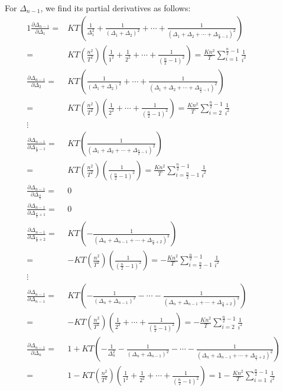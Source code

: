 For $\Delta_{n-1}$, we find its partial derivatives as follows:
\begin{alignat}{1}
{\frac{\partial \Delta_{n-1}}{\partial \Delta_{1}}} =& KT\left(\frac{1}{\Delta_1^2} + \frac{1}{(\Delta_1 + \Delta_2)^2} + \cdots + \frac{1}{(\Delta_1 + \Delta_2 + \cdots + \Delta_{\frac{n}{2}-1})^2}\right) \nonumber \\
=&KT\left(\frac{n^2}{T^2}\right)\left(\frac{1}{1^2} + \frac{1}{2^2} + \cdots + \frac{1}{(\frac{n}{2}-1)^2}\right) = \frac{Kn^2}{T} \sum\limits_{i=1}^{\frac{n}{2}-1}{\frac{1}{i^2}} \nonumber \\
{\frac{\partial \Delta_{n-1}}{\partial \Delta_{2}}} =& KT\left(\frac{1}{(\Delta_1 + \Delta_2)^2} + \cdots + \frac{1}{(\Delta_1 + \Delta_2 + \cdots + \Delta_{\frac{n}{2}-1})^2}\right) \nonumber \\
=&KT\left(\frac{n^2}{T^2}\right)\left(\frac{1}{2^2} + \cdots + \frac{1}{(\frac{n}{2}-1)^2}\right) = \frac{Kn^2}{T} \sum\limits_{i=2}^{\frac{n}{2}-1}{\frac{1}{i^2}} \nonumber \\
\vdots \nonumber \\
{\frac{\partial \Delta_{n-1}}{\partial \Delta_{\frac{n}{2}-1}}} =& KT\left(\frac{1}{(\Delta_1 + \Delta_2 + \cdots + \Delta_{\frac{n}{2}-1})^2}\right) \nonumber \\
=&KT\left(\frac{n^2}{T^2}\right)\left(\frac{1}{(\frac{n}{2}-1)^2}\right) = \frac{Kn^2}{T} \sum\limits_{i=\frac{n}{2}-1}^{\frac{n}{2}-1}{\frac{1}{i^2}} \nonumber \\	
{\frac{\partial \Delta_{n-1}}{\partial \Delta_{\frac{n}{2}}}} =& 0 \nonumber \\
{\frac{\partial \Delta_{n-1}}{\partial \Delta_{\frac{n}{2}+1}}} =& 0 \nonumber \\
{\frac{\partial \Delta_{n-1}}{\partial \Delta_{\frac{n}{2}+2}}} =& KT\left(-\frac{1}{(\Delta_n + \Delta_{n-1} + \cdots + \Delta_{\frac{n}{2}+2})^2}\right) \nonumber \\
=&-KT\left(\frac{n^2}{T^2}\right)\left(\frac{1}{(\frac{n}{2}-1)^2}\right) = -\frac{Kn^2}{T} \sum\limits_{i=\frac{n}{2}-1}^{\frac{n}{2}-1}{\frac{1}{i^2}} \nonumber \\	
\vdots \nonumber \\
{\frac{\partial \Delta_{n-1}}{\partial \Delta_{n-1}}} =& KT\left(-\frac{1}{(\Delta_n + \Delta_{n-1})^2} - \cdots - \frac{1}{(\Delta_n + \Delta_{n-1} + \cdots + \Delta_{\frac{n}{2}+2})^2}\right) \nonumber \\
=&-KT\left(\frac{n^2}{T^2}\right)\left(\frac{1}{2^2} + \cdots + \frac{1}{(\frac{n}{2}-1)^2}\right) = -\frac{Kn^2}{T} \sum\limits_{i=2}^{\frac{n}{2}-1}{\frac{1}{i^2}} \nonumber \\
{\frac{\partial \Delta_{n-1}}{\partial \Delta_{n}}} =& 1+KT\left(-\frac{1}{\Delta_n^2} - \frac{1}{(\Delta_n + \Delta_{n-1})^2} - \cdots - \frac{1}{(\Delta_n + \Delta_{n-1} + \cdots + \Delta_{\frac{n}{2}+2})^2}\right) \nonumber  \\
=&1-KT\left(\frac{n^2}{T^2}\right)\left(\frac{1}{1^2} + \frac{1}{2^2} + \cdots + \frac{1}{(\frac{n}{2}-1)^2}\right) = 1-\frac{Kn^2}{T} \sum\limits_{i=1}^{\frac{n}{2}-1}{\frac{1}{i^2}} \nonumber 
\end{alignat}

